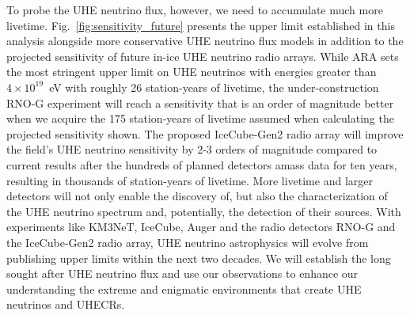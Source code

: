 To probe the UHE neutrino flux, however, we need to accumulate much more livetime.
Fig.~\ref{fig:sensitivity_future} presents the upper limit established in this analysis alongside more conservative UHE neutrino flux models in addition to the projected sensitivity of future in-ice UHE neutrino radio arrays. 
While ARA sets the most stringent upper limit on UHE neutrinos with energies greater than $4\times 10^{19}$~eV with roughly 26 station-years of livetime, the under-construction \mbox{RNO-G} experiment will reach a sensitivity that is an order of magnitude better when we acquire the 175 station-years of livetime assumed when calculating the projected sensitivity shown.
The proposed IceCube-Gen2 radio array will improve the field's UHE neutrino sensitivity by 2-3 orders of magnitude compared to current results after the hundreds of planned detectors amass data for ten years, resulting in thousands of station-years of livetime.
More livetime and larger detectors will not only enable the discovery of, but also the characterization of the UHE neutrino spectrum and, potentially, the detection of their sources.
With experiments like KM3NeT, IceCube, Auger and the radio detectors \mbox{RNO-G} and the IceCube-Gen2 radio array, UHE neutrino astrophysics will evolve from publishing upper limits within the next two decades. 
We will establish the long sought after UHE neutrino flux and use our observations to enhance our understanding the extreme and enigmatic environments that create UHE neutrinos and UHECRs.